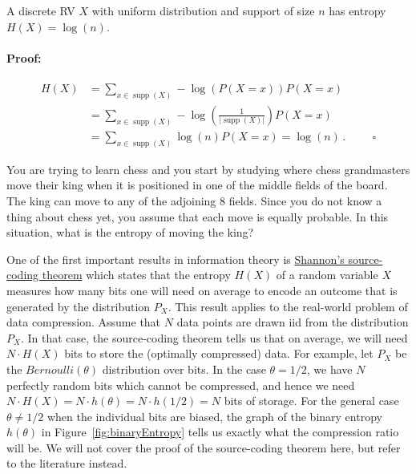 \documentclass[11pt,leqno,a4paper]{report}\usepackage[]{graphicx}\usepackage[]{color}
\newcommand{\supp}{\operatorname{supp}}
\begin{document}
\begin{Theorem}
A discrete RV $ X $ with uniform distribution and support of size $ n $ has entropy
$ H(X) = \log(n) $.
\end{Theorem}

\paragraph{Proof:}
\begin{align}
H(X) &= \underset{x \in \supp(X)}{\sum}-\log(P(X=x))P(X=x) \\
&= \underset{x \in \supp(X)}{\sum} -\log(\frac{1}{|\supp(X)|})P(X=x) \\
&= \underset{x \in \supp(X)}{\sum}\log(n)P(X=x) = \log(n) \, .
\hspace{1cm} \square
\end{align}

\begin{Exercise}
You are trying to learn chess and you start by studying where chess grandmasters move their king when it
is positioned in one of the middle fields of the board. The king can move to any of the adjoining 8 fields. Since
you do not know a thing about chess yet, you assume that each move is equally probable. In this situation,
what is the entropy of moving the king?
\end{Exercise}

One of the first important results in information theory is \href{https://en.wikipedia.org/wiki/Shannon%27s_source_coding_theorem}{Shannon's source-coding theorem} which states that the entropy $H(X)$ of a random variable $X$ measures how many bits one will need on average to encode an outcome that is generated by the distribution $ P_{X} $. 
This result applies to the real-world problem of data compression. Assume that $N$ data points are drawn iid from the distribution $P_X$. In that case, the source-coding theorem tells us that on average, we will need $N \cdot H(X)$ bits to store the (optimally compressed) data. For example, let $P_X$ be the $Bernoulli(\theta)$ distribution over bits. In the case $\theta=1/2$, we have $N$ perfectly random bits which cannot be compressed, and hence we need $N \cdot H(X) = N \cdot h(\theta) = N \cdot h(1/2) = N$ bits of storage. For the general case $\theta \neq 1/2$ when the individual bits are biased, the graph of the binary entropy $h(\theta)$ in Figure~\ref{fig:binaryEntropy} tells us exactly what the compression ratio will be. We will not cover the proof of the source-coding theorem here, but refer to the literature instead.
\end{document}
